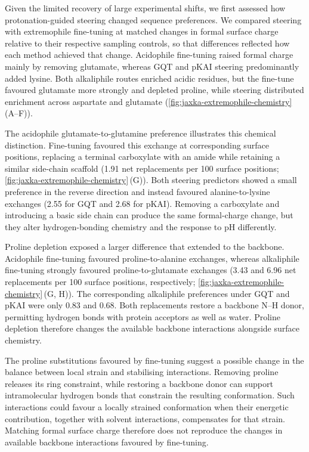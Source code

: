 Given the limited recovery of large experimental shifts, we first assessed how protonation-guided steering changed sequence preferences. We compared steering with extremophile fine-tuning at matched changes in formal surface charge relative to their respective sampling controls, so that differences reflected how each method achieved that change. Acidophile fine-tuning raised formal charge mainly by removing glutamate, whereas GQT and pKAI steering predominantly added lysine. Both alkaliphile routes enriched acidic residues, but the fine-tune favoured glutamate more strongly and depleted proline, while steering distributed enrichment across aspartate and glutamate (\cref{fig:jaxka-extremophile-chemistry}\,(A--F)).

The acidophile glutamate-to-glutamine preference illustrates this chemical distinction. Fine-tuning favoured this exchange at corresponding surface positions, replacing a terminal carboxylate with an amide while retaining a similar side-chain scaffold (1.91 net replacements per 100 surface positions; \cref{fig:jaxka-extremophile-chemistry}\,(G)). Both steering predictors showed a small preference in the reverse direction and instead favoured alanine-to-lysine exchanges (2.55 for GQT and 2.68 for pKAI). Removing a carboxylate and introducing a basic side chain can produce the same formal-charge change, but they alter hydrogen-bonding chemistry and the response to pH differently.

Proline depletion exposed a larger difference that extended to the backbone. Acidophile fine-tuning favoured proline-to-alanine exchanges, whereas alkaliphile fine-tuning strongly favoured proline-to-glutamate exchanges (3.43 and 6.96 net replacements per 100 surface positions, respectively; \cref{fig:jaxka-extremophile-chemistry}\,(G, H)). The corresponding alkaliphile preferences under GQT and pKAI were only 0.83 and 0.68. Both replacements restore a backbone N--H donor, permitting hydrogen bonds with protein acceptors as well as water. Proline depletion therefore changes the available backbone interactions alongside surface chemistry.

The proline substitutions favoured by fine-tuning suggest a possible change in the balance between local strain and stabilising interactions. Removing proline releases its ring constraint, while restoring a backbone donor can support intramolecular hydrogen bonds that constrain the resulting conformation. Such interactions could favour a locally strained conformation when their energetic contribution, together with solvent interactions, compensates for that strain. Matching formal surface charge therefore does not reproduce the changes in available backbone interactions favoured by fine-tuning.

